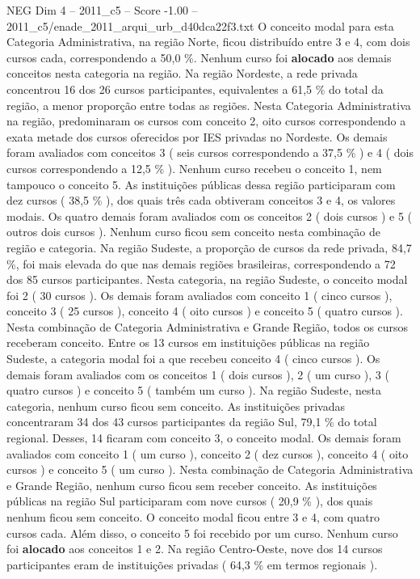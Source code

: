 \begin{textsample}{NEG Dim 4 – 2011\_c5 – Score -1.00 – 2011\_c5/enade\_2011\_arqui\_urb\_d40dca22f3.txt}
O conceito modal para esta Categoria Administrativa, na região Norte, ficou distribuído entre 3 e 4, com dois cursos cada, correspondendo a 50,0 \%.
Nenhum curso foi \textbf{alocado} aos demais conceitos nesta categoria na região.
Na região Nordeste, a rede privada concentrou 16 dos 26 cursos participantes, equivalentes a 61,5 \% do total da região, a menor proporção entre todas as regiões.
Nesta Categoria Administrativa na região, predominaram os cursos com conceito 2, oito cursos correspondendo a exata metade dos cursos oferecidos por IES privadas no Nordeste.
Os demais foram avaliados com conceitos 3 ( seis cursos correspondendo a 37,5 \% ) e 4 ( dois cursos correspondendo a 12,5 \% ).
Nenhum curso recebeu o conceito 1, nem tampouco o conceito 5.
As instituições públicas dessa região participaram com dez cursos ( 38,5 \% ), dos quais três cada obtiveram conceitos 3 e 4, os valores modais.
Os quatro demais foram avaliados com os conceitos 2 ( dois cursos ) e 5 ( outros dois cursos ).
Nenhum curso ficou sem conceito nesta combinação de região e categoria.
Na região Sudeste, a proporção de cursos da rede privada, 84,7 \%, foi mais elevada do que nas demais regiões brasileiras, correspondendo a 72 dos 85 cursos participantes.
Nesta categoria, na região Sudeste, o conceito modal foi 2 ( 30 cursos ).
Os demais foram avaliados com conceito 1 ( cinco cursos ), conceito 3 ( 25 cursos ), conceito 4 ( oito cursos ) e conceito 5 ( quatro cursos ).
Nesta combinação de Categoria Administrativa e Grande Região, todos os cursos receberam conceito.
Entre os 13 cursos em instituições públicas na região Sudeste, a categoria modal foi a que recebeu conceito 4 ( cinco cursos ).
Os demais foram avaliados com os conceitos 1 ( dois cursos ), 2 ( um curso ), 3 ( quatro cursos ) e conceito 5 ( também um curso ).
Na região Sudeste, nesta categoria, nenhum curso ficou sem conceito.
As instituições privadas concentraram 34 dos 43 cursos participantes da região Sul, 79,1 \% do total regional.
Desses, 14 ficaram com conceito 3, o conceito modal.
Os demais foram avaliados com conceito 1 ( um curso ), conceito 2 ( dez cursos ), conceito 4 ( oito cursos ) e conceito 5 ( um curso ).
Nesta combinação de Categoria Administrativa e Grande Região, nenhum curso ficou sem receber conceito.
As instituições públicas na região Sul participaram com nove cursos ( 20,9 \% ), dos quais nenhum ficou sem conceito.
O conceito modal ficou entre 3 e 4, com quatro cursos cada.
Além disso, o conceito 5 foi recebido por um curso.
Nenhum curso foi \textbf{alocado} aos conceitos 1 e 2.
Na região Centro-Oeste, nove dos 14 cursos participantes eram de instituições privadas ( 64,3 \% em termos regionais ).

\end{textsample}

